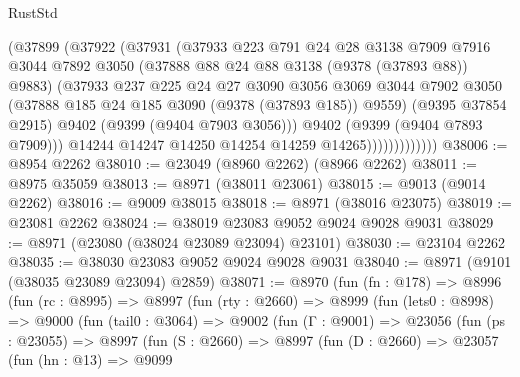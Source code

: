 \begin{lexlean}{RustStd}
\begin{coremodule}
                        (@37899
                          (@37922
                            (@37931
                              (@37933
                                @223
                                @791
                                @24
                                @28
                                @3138
                                @7909
                                @7916
                                @3044
                                @7892
                                @3050
                                (@37888 @88 @24 @88 @3138 (@9378 (@37893 @88)) @9883)
                                (@37933
                                  @237
                                  @225
                                  @24
                                  @27
                                  @3090
                                  @3056
                                  @3069
                                  @3044
                                  @7902
                                  @3050
                                  (@37888 @185 @24 @185 @3090 (@9378 (@37893 @185)) @9559)
                                  (@9395 @37854 @2915)
                                  @9402
                                  (@9399 (@9404 @7903 @3056)))
                                @9402
                                (@9399 (@9404 @7893 @7909)))
                              @14244
                              @14247
                              @14250
                              @14254
                              @14259
                              @14265)))))))))))))
@38006 := @8954 @2262
@38010 := @23049 (@8960 @2262) (@8966 @2262)
@38011 := @8975 @35059
@38013 := @8971 (@38011 @23061)
@38015 := @9013 (@9014 @2262)
@38016 := @9009 @38015
@38018 := @8971 (@38016 @23075)
@38019 := @23081 @2262
@38024 := @38019 @23083 @9052 @9024 @9028 @9031
@38029 := @8971 (@23080 (@38024 @23089 @23094) @23101)
@38030 := @23104 @2262
@38035 := @38030 @23083 @9052 @9024 @9028 @9031
@38040 := @8971 (@9101 (@38035 @23089 @23094) @2859)
@38071 := @8970
    (fun (fn : @178) =>
    @8996
      (fun (rc : @8995) =>
      @8997
        (fun (rty : @2660) =>
        @8999
          (fun (lets0 : @8998) =>
          @9000
            (fun (tail0 : @3064) =>
            @9002
              (fun (Γ : @9001) =>
              @23056
                (fun (ps : @23055) =>
                @8997
                  (fun (S : @2660) =>
                  @8997
                    (fun (D : @2660) =>
                    @23057
                      (fun (hn : @13) =>
                      @9099

\end{coremodule}
\end{lexlean}
